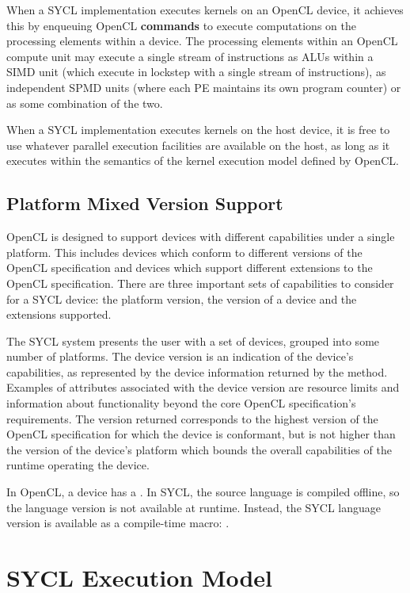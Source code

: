 When a SYCL implementation executes kernels on an OpenCL
device, it achieves this by enqueuing OpenCL \textbf{commands} to
execute computations on the processing elements within a device.  The
processing elements within an OpenCL compute unit may execute a single
stream of instructions as ALUs within a SIMD unit (which execute in
lockstep with a single stream of instructions), as independent SPMD
units (where each PE maintains its own program counter) or as some
combination of the two.

When a SYCL implementation executes kernels on the host device,
it is free to use whatever parallel execution facilities are available on the
host, as long as it executes within the semantics of the kernel execution model
defined by OpenCL.

\subsection{Platform Mixed Version Support}

OpenCL is designed to support devices with different capabilities under a
single platform.  This includes devices which conform to different
versions of the OpenCL specification and devices which support different
extensions to the OpenCL specification.  There are three important sets of
capabilities to consider for a SYCL device: the platform version, the
version of a device and the extensions supported.

The SYCL system presents the user with a set of devices, grouped into some
number of platforms.
The device version is an indication of the device's
capabilities, as represented by the device information returned by the
 method.  Examples of attributes
associated with the device version are resource limits and information
about functionality beyond the core OpenCL specification's requirements.
The version returned corresponds to the highest version of the OpenCL
specification for which the device is conformant, but is not higher than
the version of the device's platform which bounds the overall capabilities
of the runtime operating the device.

In OpenCL, a device has a . In SYCL, the source
language is compiled offline, so the language version is not available at
runtime.  Instead, the SYCL language version is available as a
compile-time macro: .


\section{SYCL Execution Model}


